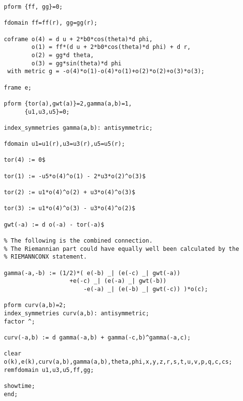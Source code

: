 {\begin{verbatim}
pform {ff, gg}=0;

fdomain ff=ff(r), gg=gg(r);

coframe o(4) = d u + 2*b0*cos(theta)*d phi,
        o(1) = ff*(d u + 2*b0*cos(theta)*d phi) + d r,
        o(2) = gg*d theta,
        o(3) = gg*sin(theta)*d phi
 with metric g = -o(4)*o(1)-o(4)*o(1)+o(2)*o(2)+o(3)*o(3);

frame e;

pform {tor(a),gwt(a)}=2,gamma(a,b)=1,
      {u1,u3,u5}=0;

index_symmetries gamma(a,b): antisymmetric;

fdomain u1=u1(r),u3=u3(r),u5=u5(r);

tor(4) := 0$

tor(1) := -u5*o(4)^o(1) - 2*u3*o(2)^o(3)$

tor(2) := u1*o(4)^o(2) + u3*o(4)^o(3)$

tor(3) := u1*o(4)^o(3) - u3*o(4)^o(2)$

gwt(-a) := d o(-a) - tor(-a)$

% The following is the combined connection.
% The Riemannian part could have equally well been calculated by the
% RIEMANNCONX statement.

gamma(-a,-b) := (1/2)*( e(-b) _| (e(-c) _| gwt(-a))
	               +e(-c) _| (e(-a) _| gwt(-b))
                       -e(-a) _| (e(-b) _| gwt(-c)) )*o(c);

pform curv(a,b)=2;
index_symmetries curv(a,b): antisymmetric;
factor ^;

curv(-a,b) := d gamma(-a,b) + gamma(-c,b)^gamma(-a,c);

clear o(k),e(k),curv(a,b),gamma(a,b),theta,phi,x,y,z,r,s,t,u,v,p,q,c,cs;
remfdomain u1,u3,u5,ff,gg;

showtime;
end;

\end{verbatim}
}
